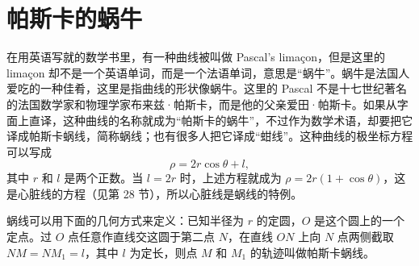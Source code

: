 \section{帕斯卡的蜗牛}

在用英语写就的数学书里，有一种曲线被叫做 Pascal's limaçon，但是这里的 limaçon 却不是一个英语单词，而是一个法语单词，意思是“蜗牛”。蜗牛是法国人爱吃的一种佳肴，这里是指曲线的形状像蜗牛。这里的 Pascal 不是十七世纪著名的法国数学家和物理学家布来兹·帕斯卡，而是他的父亲爱田·帕斯卡。如果从字面上直译，这种曲线的名称就成为“帕斯卡的蜗牛”，不过作为数学术语，却要把它译成帕斯卡蜗线，简称蜗线；也有很多人把它译成“蚶线”。这种曲线的极坐标方程可以写成
\[
  \rho = 2r\cos\theta + l,
\]
其中 $r$ 和 $l$ 是两个正数。当 $l=2r$ 时，上述方程就成为 $\rho = 2r(1+\cos\theta)$，这是心脏线的方程（见第 28 节），所以心脏线是蜗线的特例。

蜗线可以用下面的几何方式来定义：已知半径为 $r$ 的定圆，$O$ 是这个圆上的一个定点。过 $O$ 点任意作直线交这圆于第二点 $N$，在直线 $ON$ 上向 $N$ 点两侧截取 $NM = NM_1 = l$，其中 $l$ 为定长，则点 $M$ 和 $M_1$ 的轨迹叫做帕斯卡蜗线。

